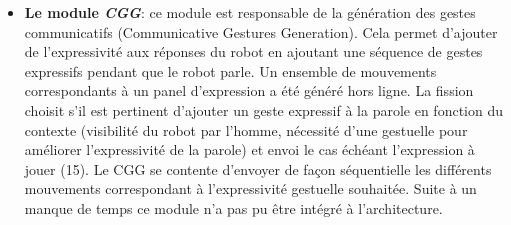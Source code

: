 \documentclass[a4paper,11pt,twoside]{StyleThese}
\begin{document}
\begin{itemize}
\item \textbf{Le module \textit{CGG}}: ce module est responsable de la génération des gestes communicatifs (Communicative Gestures Generation). Cela permet d'ajouter de l'expressivité aux réponses du robot en ajoutant une séquence de gestes expressifs pendant que le robot parle. Un ensemble de mouvements correspondants à un panel d'expression a été généré hors ligne. La fission choisit s'il est pertinent d'ajouter un geste expressif à la parole en fonction du contexte (visibilité du robot par l'homme, nécessité d'une gestuelle pour améliorer l'expressivité de la parole) et envoi le cas échéant l'expression à jouer (15). Le CGG se contente d'envoyer de façon séquentielle les différents mouvements correspondant à l'expressivité gestuelle souhaitée.
Suite à un manque de temps ce module n'a pas pu être intégré à l'architecture.
\end{itemize}

\end{document}
